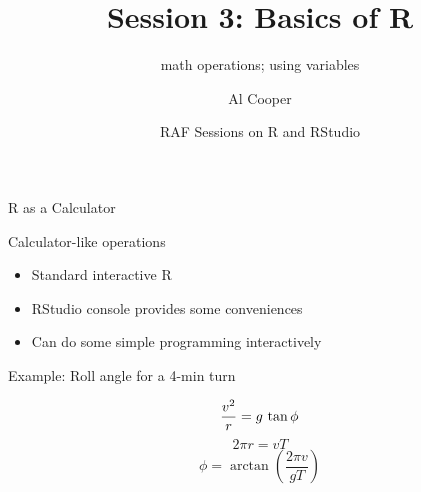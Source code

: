 \documentclass{beamer}\usepackage[]{graphicx}\usepackage[]{color}
\newcommand\makebeamertitle{\frame{\maketitle}}%
\begin{document}


\title{Session 3: Basics of R}


\subtitle{math operations; using variables}


\author{Al Cooper }


\date{RAF Sessions on R and RStudio}

\makebeamertitle


\begin{frame}{R as a Calculator}

\begin{block}{}
{Calculator-like operations}
\begin{itemize}
\item Standard interactive R
\item RStudio console provides some conveniences
\item Can do some simple programming interactively
\end{itemize}
\end{block}
\begin{exampleblock}{}
{Example: Roll angle for a 4-min turn}

\[
\frac{v^{2}}{r}=g\thinspace\tan\phi
\]
\[
2\pi r=vT
\]
\[
\phi=\arctan\left(\frac{2\pi v}{gT}\right)
\]



\end{exampleblock}
\end{frame}
\end{document}
